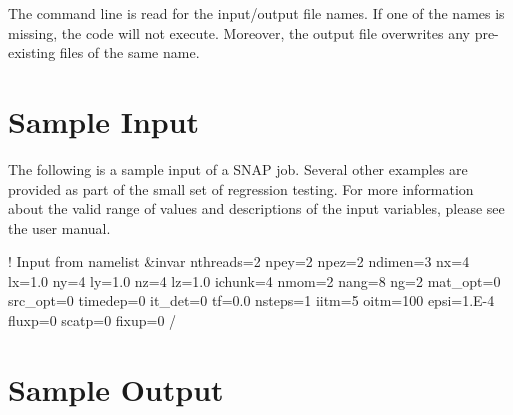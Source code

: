 The command line is read for the input/output file names. If one of the names is missing, the code will not execute. Moreover, the output file overwrites any pre-\/existing files of the same name.

\section*{Sample Input}

The following is a sample input of a S\-N\-A\-P job. Several other examples are provided as part of the small set of regression testing. For more information about the valid range of values and descriptions of the input variables, please see the user manual. \begin{DoxyVerb}! Input from namelist
&invar
  nthreads=2
  npey=2
  npez=2
  ndimen=3
  nx=4
  lx=1.0
  ny=4
  ly=1.0
  nz=4
  lz=1.0
  ichunk=4
  nmom=2
  nang=8
  ng=2
  mat_opt=0
  src_opt=0
  timedep=0
  it_det=0
  tf=0.0
  nsteps=1
  iitm=5
  oitm=100
  epsi=1.E-4
  fluxp=0
  scatp=0
  fixup=0
/
\end{DoxyVerb}


\section*{Sample Output}

